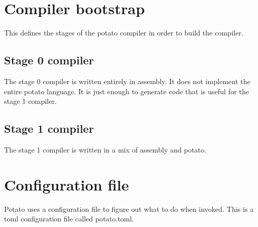 \documentclass[12pt]{article}
\begin{document}
\section {Compiler bootstrap}

This defines the stages of the potato compiler in order to build the compiler.

\subsection {Stage 0 compiler}
The stage 0 compiler is written entirely in assembly. It does not implement the entire potato language. It is just enough 
to generate code that is useful for the stage 1 compiler.

\subsection {Stage 1 compiler}
The stage 1 compiler is written in a mix of assembly and potato.

\section {Configuration file}
Potato uses a configuration file to figure out what to do when invoked. 
This is a toml configuration file called potato.toml.
\end{document}
